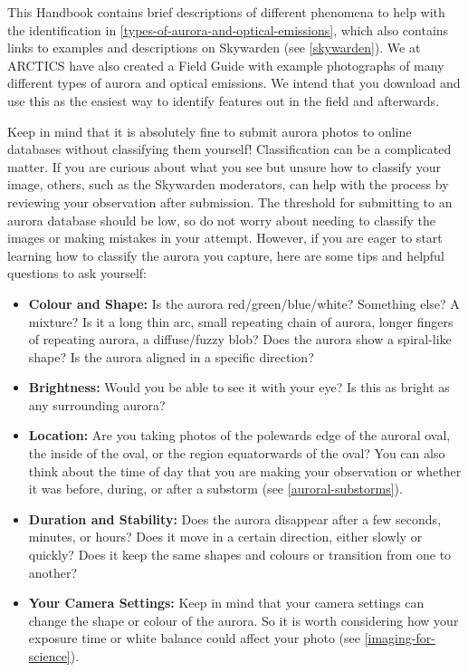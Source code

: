 \documentclass{article}
\begin{document}
This Handbook contains brief descriptions of different phenomena to help with the identification in \ref{types-of-aurora-and-optical-emissions}, which also contains links to examples and descriptions on Skywarden (see \ref{skywarden}). We at ARCTICS have also created a Field Guide with example photographs of many different types of aurora and optical emissions. We intend that you download and use this as the easiest way to identify features out in the field and afterwards.

Keep in mind that it is absolutely fine to submit aurora photos to online databases without classifying them yourself! Classification can be a complicated matter. If you are curious about what you see but unsure how to classify your image, others, such as the Skywarden moderators, can help with the process by reviewing your observation after submission. The threshold for submitting to an aurora database should be low, so do not worry about needing to classify the images or making mistakes in your attempt. However, if you are eager to start learning how to classify the aurora you capture, here are some tips and helpful questions to ask yourself:
\begin{itemize}
    \item \textbf{Colour and Shape:} Is the aurora red/green/blue/white? Something else? A mixture? Is it a long thin arc, small repeating chain of aurora, longer fingers of repeating aurora, a diffuse/fuzzy blob? Does the aurora show a spiral-like shape? Is the aurora aligned in a specific direction?
    \item \textbf{Brightness:} Would you be able to see it with your eye? Is this as bright as any surrounding aurora?
    \item \textbf{Location:} Are you taking photos of the polewards edge of the auroral oval, the inside of the oval, or the region equatorwards of the oval? You can also think about the time of day that you are making your observation or whether it was before, during, or after a substorm (see \ref{auroral-substorms}).
    \item \textbf{Duration and Stability:} Does the aurora disappear after a few seconds, minutes, or hours? Does it move in a certain direction, either slowly or quickly? Does it keep the same shapes and colours or transition from one to another?
    \item \textbf{Your Camera Settings:} Keep in mind that your camera settings can change the shape or colour of the aurora. So it is worth considering how your exposure time or white balance could affect your photo (see \ref{imaging-for-science}).
\end{itemize}
\end{document}

